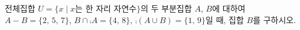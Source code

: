 전체집합 $U=\{x \mid x$는 한 자리 자연수$\}$의 두 부분집합 $A$, $B$에 대하여 $A-B=\{2,\,5,\,7\}$, $B\cap\comp{A}=\{4,\,8\}$, $\comp{(A\cup B)}=\{1,\,9\}$일 때, 집합 $B$를 구하시오.
